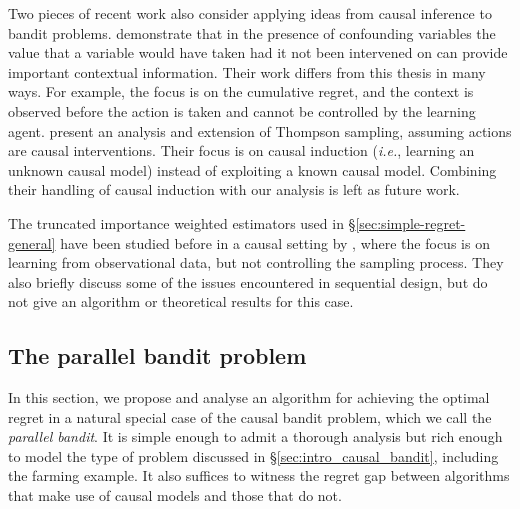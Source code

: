 \documentclass[11pt,a4paper,twoside]{report}
\newcommand{\ie}{\textit{i.e.}}
\newcommand{\bigtheta}[1]{\Theta\left( #1 \right)}
\newcommand{\bigthetatilde}[1]{\tilde{\Theta}\left( #1 \right)}
\newcommand{\bigomega}[1]{\Omega\left( #1 \right)}
\theoremstyle{plain}
\theoremstyle{definition}
\begin{document}

Two pieces of recent work also consider applying ideas from causal inference to bandit problems. \citet{Bareinboim2015} demonstrate that in the presence of confounding variables the value that a variable would have taken had it not been 
intervened on can provide important contextual information. Their work differs from this thesis in many ways. For example, the focus is on the cumulative regret, and the context is observed before the action is taken and cannot be controlled by the learning agent. \citet{Ortega2014thompson} present an analysis and extension of Thompson sampling, assuming actions are causal interventions. Their focus is on causal induction (\ie, learning an unknown causal model) instead of exploiting a known causal model. Combining their handling of  causal induction with our analysis is left as future work.

The truncated importance weighted estimators used in \S\ref{sec:simple-regret-general} have been studied before in a causal setting by \citet{Bottou2013}, 
where the focus is on learning from observational data, but not controlling the sampling process. They also briefly discuss some of the issues 
encountered in sequential design, but do not give an algorithm or theoretical results for this case.


\subsection{The parallel bandit problem}
\label{sec:simple-regret}
In this section, we propose and analyse an algorithm for achieving the optimal regret in a natural special case of the causal bandit problem, which we call the {\it parallel bandit}.
It is simple enough to admit a thorough analysis but rich enough to model the type of problem discussed in \S\ref{sec:intro_causal_bandit}, including the farming example. It also suffices to witness the regret gap between algorithms that make use of causal models and those that do not.
\end{document}
